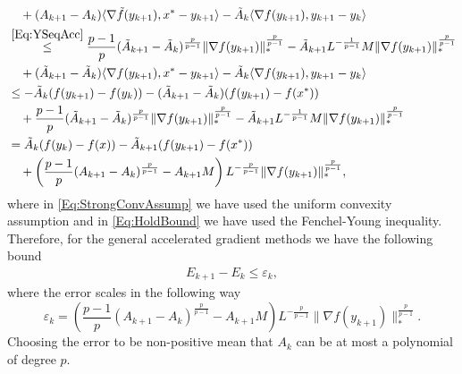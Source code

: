 \documentclass[11pt]{article}
\theoremstyle{plain}
\begin{document}
\begin{subequations}
\begin{align}
 &\quad + (A_{k+1} -A_{k})\langle\nabla \tilde  f(y_{k+1}),  x^\ast - y_{k+1}\rangle
 -\tilde A_{k}\langle \nabla f(y_{k+1}), y_{k+1} - y_k \rangle \notag\\
& \overset{\eqref{Eq:YSeqAcc}}{\leq}\frac{p-1}{p}(\tilde A_{k+1} -\tilde A_{k})^{\frac{p}{p-1}} \|\nabla f(y_{k+1})\|_\ast^{\frac{p}{p-1}} - \tilde A_{k+1}L^{-\frac{1}{p-1}}M \|\nabla f(y_{k+1})\|_\ast^{\frac{p}{p-1}}   \notag\\
&\quad  + (\tilde A_{k+1} -\tilde A_{k})\langle\nabla   f(y_{k+1}),  x^\ast - y_{k+1}\rangle-\tilde A_{k}\langle \nabla  f(y_{k+1}), y_{k+1} - y_k \rangle \notag\\
& \leq -\tilde A_k( f(y_{k+1}) -f(y_k)) - (\tilde A_{k+1} -\tilde A_{k})(f(y_{k+1}) - f(x^\ast)) \notag\\
&\quad+  \frac{p-1}{p}(\tilde A_{k+1} -\tilde A_{k})^{\frac{p}{p-1}} \|\nabla f(y_{k+1})\|_\ast^{\frac{p}{p-1}}  - \tilde A_{k+1}L^{-\frac{1}{p-1}} M \|\nabla f(y_{k+1})\|_\ast^{\frac{p}{p-1}}  \notag \\
& = \tilde  A_k (f(y_k) - f(x)) -  \tilde A_{k+1}( f(y_{k+1}) -  f(x^\ast)) \notag \\
&\quad+\left(\frac{p-1}{p}(A_{k+1} -A_{k})^{\frac{p}{p-1}} - A_{k+1}M\right) L^{-\frac{p}{p-1}}\|\nabla f(y_{k+1})\|_\ast^{\frac{p}{p-1}} \notag,
\end{align}
\end{subequations}
where in \eqref{Eq:StrongConvAssump} we have used the uniform convexity assumption and in \eqref{Eq:HoldBound} we have used the Fenchel-Young inequality. Therefore, for the general accelerated gradient methods we have the following bound 
\begin{align*}
E_{k+1} - E_k \leq \varepsilon_k,
\end{align*}
where the error scales in the following way
\begin{equation*}
\varepsilon_k =\left(\frac{p-1}{p}(A_{k+1} -A_{k})^{\frac{p}{p-1}} - A_{k+1}M\right) L^{-\frac{p}{p-1}}\|\nabla  f(y_{k+1})\|_\ast^{\frac{p}{p-1}}.
\end{equation*}
Choosing the error to be non-positive mean that $A_k$ can be at most a polynomial of degree $p$. 
\end{document}
